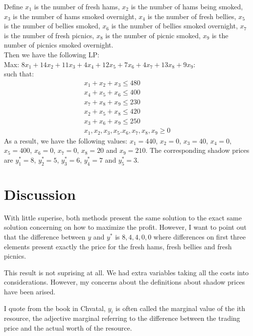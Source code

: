 \documentclass{article}
\begin{document}
Define $x_1$  is the number of fresh hams, $x_2$ is the number of hams being smoked, $x_3$ is the number of hams smoked overnight,
$x_4$ is the number of fresh bellies, $x_5$ is the number of bellies smoked, $x_6$ is the number of bellies smoked overnight,
$x_7$ is the number of fresh picnics, $x_8$ is the number of picnic smoked, $x_9$ is the number of picnics smoked overnight. \\
Then we have the following LP: \\
Max: $8x_1 + 14x_2 + 11x_3 + 4x_4+ 12x_5 +7x_6 +4x_7+13x_8+9x_9$: \\
such that:
\begin{align*}
	x_1 + x_2 + x_3 \leq 480 \\
	x_4 + x_5 + x_6 \leq 400 \\
	x_7 + x_8 + x_9 \leq 230 \\
	x_2 + x_5 + x_8 \leq 420 \\
	x_3 + x_6 + x_9 \leq 250 \\
	x_1, x_2, x_3, x_5. x_6, x_7, x_8, x_9 \geq 0
\end{align*}
As a result, we have the following values: $x_1 = 440$, $x_2 = 0$, $x_3 = 40$, $x_4 = 0$,
$x_5 = 400$, $x_6 = 0$, $x_7 = 0$, $x_8 = 20$ and $x_9 = 210$. The corresponding shadow prices are $y_1^* = 8$, $y_2^* =5$, 
$y_3^*=6$, $y_4^* = 7$ and $y_5^* = 3$.

\section{Discussion}

With little superise, both methods present the same solution to the exact same solution concerning
on how to maximize the profit. However, I want to point out that the difference between 
$y$ and $y^*$ is $8, 4, 4, 0, 0$ where differences on first three elements present exactly the price for 
the fresh hams, fresh bellies and fresh picnics.

This result is not suprising at all. We had extra variables taking all the costs into 
considerations. However, my concerns about the definitions about shadow prices have been 
arised.

I quote from the book in Chvatal, $y_i$ is often called the marginal value of the ith resource,
the adjective marginal referring to the difference between the trading price and the actual 
worth of the resource.
\end{document}
